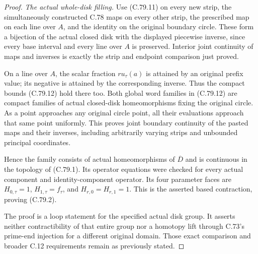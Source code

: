 \begin{proof}
\emph{The actual whole-disk filling.}
Use (C.79.11) on every new strip, the
simultaneously constructed C.78 maps on
every other strip, the prescribed map
on each line over $A$, and the identity
on the original boundary circle. These
form a bijection of the actual closed
disk with the displayed piecewise inverse,
since every base interval and every line
over $A$ is preserved. Interior joint
continuity of maps and inverses is exactly
the strip and endpoint comparison just
proved.

On a line over $A$, the scalar fraction
$r u_\tau(a)$ is attained by an original
prefix value; its negative is attained
by the corresponding inverse. Thus the
compact bounds (C.79.12) hold there too.
Both global word families in (C.79.12)
are compact families of actual closed-disk
homeomorphisms fixing the original circle.
As a point approaches any original circle
point, all their evaluations approach that
same point uniformly. This proves joint
boundary continuity of the pasted maps
and their inverses, including arbitrarily
varying strips and unbounded principal
coordinates.

Hence the family consists of actual
homeomorphisms of $\overline D$ and is
continuous in the topology of (C.79.1).
Its operator equations were checked for
every actual component and identity-component
operator. Its four parameter faces are
$H_{0,\tau}=1$, $H_{1,\tau}=f_\tau$,
and $H_{r,0}=H_{r,1}=1$.
This is the asserted based contraction,
proving (C.79.2).

The proof is a loop statement for the
specified actual disk group. It asserts
neither contractibility of that entire
group nor a homotopy lift through C.73's
prime-end injection for a different
original domain. Those exact comparison
and broader C.12 requirements remain
as previously stated.
\end{proof}
